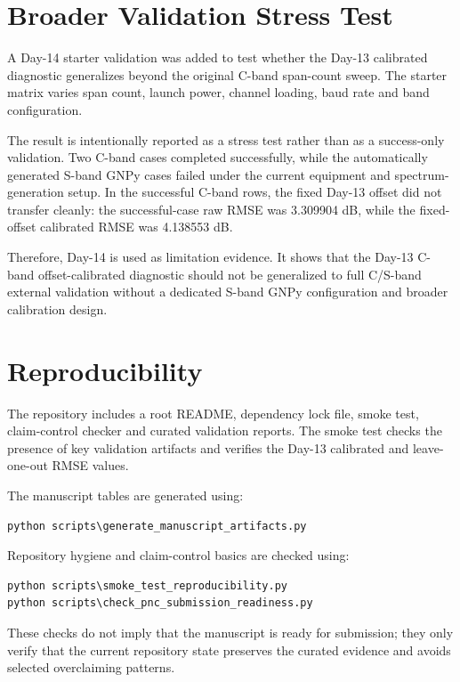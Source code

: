 ﻿\documentclass[pdflatex,sn-mathphys-num]{sn-jnl}
\begin{document}
\section{Broader Validation Stress Test}

A Day-14 starter validation was added to test whether the Day-13 calibrated diagnostic generalizes beyond the original C-band span-count sweep. The starter matrix varies span count, launch power, channel loading, baud rate and band configuration.

The result is intentionally reported as a stress test rather than as a success-only validation. Two C-band cases completed successfully, while the automatically generated S-band GNPy cases failed under the current equipment and spectrum-generation setup. In the successful C-band rows, the fixed Day-13 offset did not transfer cleanly: the successful-case raw RMSE was 3.309904 dB, while the fixed-offset calibrated RMSE was 4.138553 dB.



Therefore, Day-14 is used as limitation evidence. It shows that the Day-13 C-band offset-calibrated diagnostic should not be generalized to full C/S-band external validation without a dedicated S-band GNPy configuration and broader calibration design.


\section{Reproducibility}

The repository includes a root README, dependency lock file, smoke test, claim-control checker and curated validation reports. The smoke test checks the presence of key validation artifacts and verifies the Day-13 calibrated and leave-one-out RMSE values.

The manuscript tables are generated using:
\begin{verbatim}
python scripts\generate_manuscript_artifacts.py
\end{verbatim}

Repository hygiene and claim-control basics are checked using:
\begin{verbatim}
python scripts\smoke_test_reproducibility.py
python scripts\check_pnc_submission_readiness.py
\end{verbatim}

These checks do not imply that the manuscript is ready for submission; they only verify that the current repository state preserves the curated evidence and avoids selected overclaiming patterns.
\end{document}
